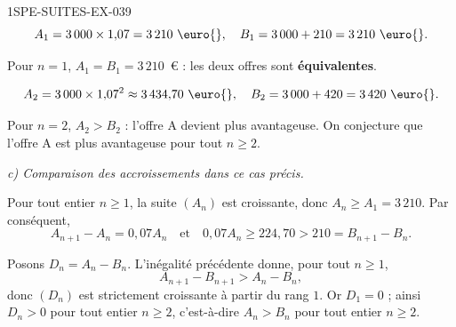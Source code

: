\begin{corrige}{1SPE-SUITES-EX-039}
\[
  A_1 = 3\,000 \times 1{,}07 = 3\,210 \text{ \euro{}}, \quad B_1 = 3\,000 + 210 = 3\,210 \text{ \euro{}}.
\]

Pour $n = 1$, $A_1 = B_1 = 3\,210$~\euro{} : les deux offres sont \textbf{équivalentes}.

\[
  A_2 = 3\,000 \times 1{,}07^2 \approx 3\,434{,}70 \text{ \euro{}}, \quad B_2 = 3\,000 + 420 = 3\,420 \text{ \euro{}}.
\]


Pour $n = 2$, $A_2 > B_2$ : l'offre A devient plus avantageuse. On conjecture que l'offre A est plus avantageuse pour tout $n \geq 2$.

\textit{c) Comparaison des accroissements dans ce cas précis.}

Pour tout entier $n \geq 1$, la suite $(A_n)$ est croissante, donc
$A_n \geq A_1=3\,210$. Par conséquent,
\[
A_{n+1}-A_n=0{,}07A_n
\quad\text{et}\quad
0{,}07A_n \geq 224{,}70 > 210=B_{n+1}-B_n.
\]

Posons $D_n=A_n-B_n$. L'inégalité précédente donne, pour tout $n\geq1$,
\[
A_{n+1}-B_{n+1}>A_n-B_n,
\]
donc $(D_n)$ est strictement croissante à partir du rang $1$. Or
$D_1=0$ ; ainsi $D_n>0$ pour tout entier $n\geq2$, c'est-à-dire
$A_n>B_n$ pour tout entier $n\geq2$.


\end{corrige}

